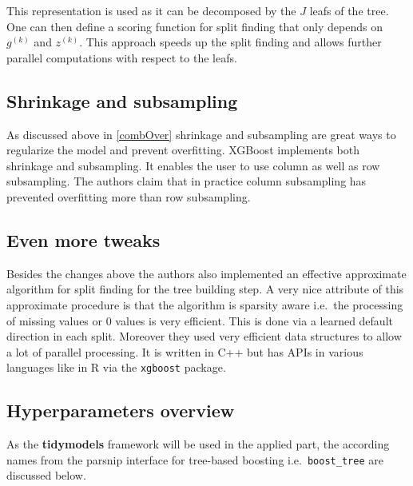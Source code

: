 \documentclass[
]{book}
\begin{document}
This representation is used as it can be decomposed by the \(J\) leafs of the tree. One can then define a scoring function for split finding that only depends on \(g^{(k)}\) and \(z^{(k)}\). This approach speeds up the split finding and allows further parallel computations with respect to the leafs.

\hypertarget{shrinkage-and-subsampling}{%
\subsection{Shrinkage and subsampling}\label{shrinkage-and-subsampling}}

As discussed above in \ref{combOver} shrinkage and subsampling are great ways to regularize the model and prevent overfitting. XGBoost implements both shrinkage and subsampling. It enables the user to use column as well as row subsampling. The authors claim that in practice column subsampling has prevented overfitting more than row subsampling.\citep{xgboostPaper}

\hypertarget{even-more-tweaks}{%
\subsection{Even more tweaks}\label{even-more-tweaks}}

Besides the changes above the authors also implemented an effective approximate algorithm for split finding for the tree building step. A very nice attribute of this approximate procedure is that the algorithm is sparsity aware i.e.~the processing of missing values or 0 values is very efficient. This is done via a learned default direction in each split. Moreover they used very efficient data structures to allow a lot of parallel processing.\citep{xgboostPaper} It is written in C++ but has APIs in various languages like in R via the \texttt{xgboost} package.\citep{xgboost_package}

\hypertarget{hyperparameters-overview}{%
\subsection{Hyperparameters overview}\label{hyperparameters-overview}}

As the \textbf{tidymodels} framework will be used in the applied part, the according names from the parsnip interface for tree-based boosting i.e.~\texttt{boost\_tree} are discussed below.\citep[\citet{xgboost_package}, \citet{tidymodels}]{xgboostPaper}
\end{document}
